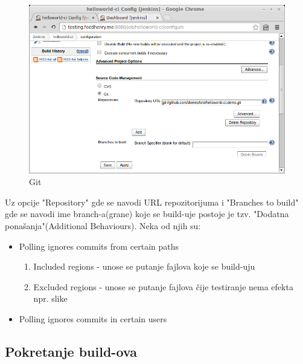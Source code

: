 \begin{figure}[h!]
\begin{center}
\includegraphics[scale=0.75, totalheight=0.4\textheight]{git_jenkins.jpg}
\end{center}
\caption{Git}
\label{fig:git}
\end{figure}

Uz opcije "Repository" gde se navodi URL repozitorijuma i "Branches to build" gde se navodi ime branch-a(grane) koje se build-uje postoje je tzv. "Dodatna ponašanja"(Additional Behaviours). Neka od njih su:
 
\begin{itemize}  
\item Polling ignores commits from certain paths
\begin{enumerate}
\item Included regions - unose se putanje fajlova koje se build-uju
\item Excluded regions - unose se putanje fajlova čije testiranje nema efekta npr. slike
\end{enumerate}
\item Polling ignores commits in certain users 
\end{itemize}

\subsection{Pokretanje build-ova}

